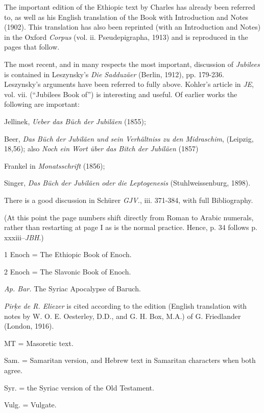 
The important edition of the Ethiopic text by Charles has already been referred to, as well as his English translation of the Book with Introduction and Notes (1902). This translation has also been reprinted (with an Introduction and Notes) in the Oxford \emph{Corpus} (vol. ii. Pseudepigrapha, 1913) and is reproduced in the pages that follow.

The most recent, and in many respects the most important, discussion of \emph{Jubilees} is contained in Leszynsky's \emph{Die Sadduzäer} (Berlin, 1912), pp. 179-236. Leszynsky's arguments have been referred to fully above. Kohler's article in \emph{JE}, vol. vii. (``Jubilees Book of'') is interesting and useful. Of earlier works the following are important:

Jellinek, \emph{Ueber das Büch der Jubiläen} (1855);

Beer, \emph{Das Büch der Jubiläen und sein Verhältniss zu den Midraschim}, (Leipzig, 18,56); also \emph{Noch ein Wort über das Bitch der Jubiläen} (1857)

Frankel in \emph{Monatsschrift} (1856);

Singer, \emph{Das Büch der Jubiläen oder die Leptogenesis} (Stuhlweissenburg, 1898).

There is a good discussion in Schürer \emph{GJV.}, iii. 371-384, with full Bibliography.

(At this point the page numbers shift directly from Roman to Arabic numerals, rather than restarting at page I as is the normal practice. Hence, p. 34 follows p. xxxiii--\emph{JBH}.)


1 Enoch = The Ethiopic Book of Enoch.

2 Enoch = The Slavonic Book of Enoch.

\emph{Ap. Bar.} The Syriac Apocalypse of Baruch.

\emph{Pir\d{k}e de R. Eliezer} is cited according to the edition (English translation with notes by W. O. E. Oesterley, D.D., and G. H. Box, M.A.) of G. Friedlander (London, 1916).

MT = Masoretic text.

Sam. = Samaritan version, and Hebrew text in Samaritan characters when both agree.

Syr. = the Syriac version of the Old Testament.

Vulg. = Vulgate.

